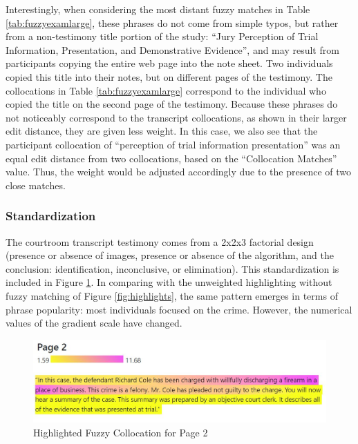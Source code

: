 \documentclass[print]{nuthesis}
\begin{document}
Interestingly, when considering the most distant fuzzy matches in Table \ref{tab:fuzzyexamlarge}, these phrases do not come from simple typos, but rather from a non-testimony title portion of the study: ``Jury Perception of Trial Information, Presentation, and Demonstrative Evidence'', and may result from participants copying the entire web page into the note sheet.
Two individuals copied this title into their notes, but on different pages of the testimony.
The collocations in Table \ref{tab:fuzzyexamlarge} correspond to the individual who copied the title on the second page of the testimony.
Because these phrases do not noticeably correspond to the transcript collocations, as shown in their larger edit distance, they are given less weight.
In this case, we also see that the participant collocation of ``perception of trial information presentation'' was an equal edit distance from two collocations, based on the ``Collocation Matches'' value.
Thus, the weight would be adjusted accordingly due to the presence of two close matches.

\hypertarget{standardization-1}{%
\subsubsection{Standardization}\label{standardization-1}}

The courtroom transcript testimony comes from a 2x2x3 factorial design (presence or absence of images, presence or absence of the algorithm, and the conclusion: identification, inconclusive, or elimination).
This standardization is included in Figure \ref{fig:weightedhighlights}.
In comparing with the unweighted highlighting without fuzzy matching of Figure \ref{fig:highlights}, the same pattern emerges in terms of phrase popularity: most individuals focused on the crime.
However, the numerical values of the gradient scale have changed.

\begin{figure}

{\centering \includegraphics[width=\linewidth]{images/weightedcollocationanalysis} 

}

\caption{Highlighted Fuzzy Collocation for Page 2}\label{fig:weightedhighlights}
\end{figure}
\end{document}
